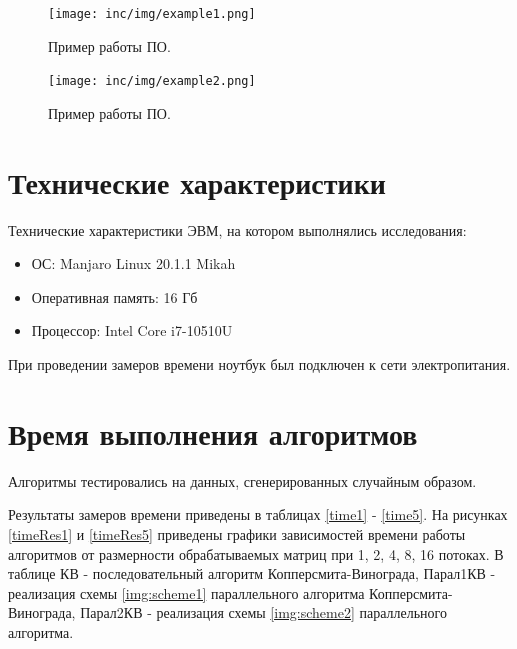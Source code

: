 \documentclass[12pt]{report}
\begin{document}
\begin{figure}
\begin{center}
\texttt{[image: inc/img/example1.png]}
\captionsetup{justification=centering}
	\caption{Пример работы ПО.}
	\label{img:example1}	
\end{center}
\end{figure}

\begin{figure}
\begin{center}
\texttt{[image: inc/img/example2.png]}
\captionsetup{justification=centering}
	\caption{Пример работы ПО.}
	\label{img:example2}	
\end{center}
\end{figure}

\newpage

\section{Технические характеристики}
Технические характеристики ЭВМ, на котором выполнялись исследования:
\begin{itemize}
\item ОС: Manjaro Linux 20.1.1 Mikah
\item Оперативная память: 16 Гб
\item Процессор: Intel Core i7-10510U
\end{itemize}


При проведении замеров времени ноутбук был подключен к сети электропитания.

\section{Время выполнения алгоритмов}
Алгоритмы тестировались на данных, сгенерированных случайным образом.

Результаты замеров времени приведены в таблицах \ref{time1} - \ref{time5}. На рисунках \ref{timeRes1} и \ref{timeRes5} приведены графики зависимостей времени работы алгоритмов от размерности обрабатываемых матриц при 1, 2, 4, 8, 16 потоках. В таблице КВ - последовательный алгоритм Копперсмита-Винограда, Парал1КВ - реализация схемы \ref{img:scheme1} параллельного алгоритма Копперсмита-Винограда, Парал2КВ - реализация схемы \ref{img:scheme2} параллельного алгоритма.
\end{document}
